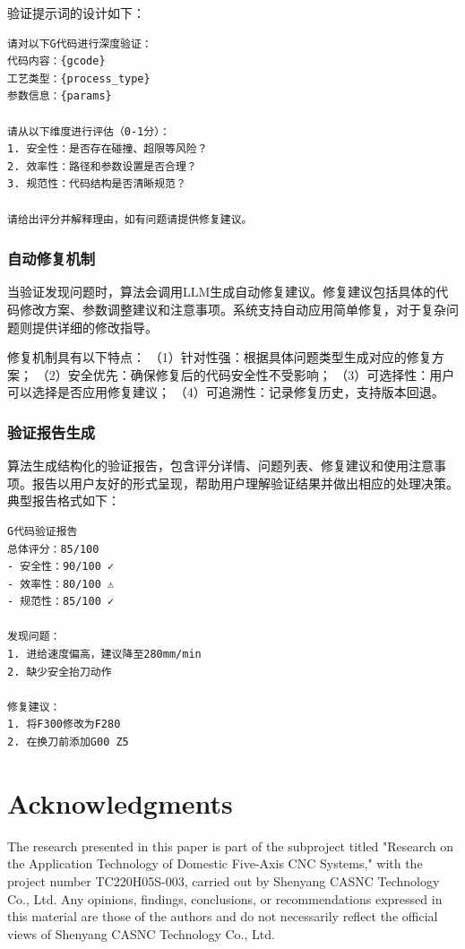 \documentclass[preprint,12pt]{elsarticle}
\begin{document}
验证提示词的设计如下：

\begin{verbatim}
请对以下G代码进行深度验证：
代码内容：{gcode}
工艺类型：{process_type}
参数信息：{params}

请从以下维度进行评估（0-1分）：
1. 安全性：是否存在碰撞、超限等风险？
2. 效率性：路径和参数设置是否合理？
3. 规范性：代码结构是否清晰规范？

请给出评分并解释理由，如有问题请提供修复建议。
\end{verbatim}

\subsubsection{自动修复机制}

当验证发现问题时，算法会调用LLM生成自动修复建议。修复建议包括具体的代码修改方案、参数调整建议和注意事项。系统支持自动应用简单修复，对于复杂问题则提供详细的修改指导。

修复机制具有以下特点：
（1）针对性强：根据具体问题类型生成对应的修复方案；
（2）安全优先：确保修复后的代码安全性不受影响；
（3）可选择性：用户可以选择是否应用修复建议；
（4）可追溯性：记录修复历史，支持版本回退。

\subsubsection{验证报告生成}

算法生成结构化的验证报告，包含评分详情、问题列表、修复建议和使用注意事项。报告以用户友好的形式呈现，帮助用户理解验证结果并做出相应的处理决策。典型报告格式如下：

\begin{verbatim}
G代码验证报告
总体评分：85/100
- 安全性：90/100 ✓
- 效率性：80/100 ⚠
- 规范性：85/100 ✓

发现问题：
1. 进给速度偏高，建议降至280mm/min
2. 缺少安全抬刀动作

修复建议：
1. 将F300修改为F280
2. 在换刀前添加G00 Z5
\end{verbatim}

\section{Acknowledgments}

The research presented in this paper is part of the subproject titled "Research on the Application Technology of Domestic Five-Axis CNC Systems," with the project number TC220H05S-003, carried out by Shenyang CASNC Technology Co., Ltd. Any opinions, findings, conclusions, or recommendations expressed in this material are those of the authors and do not necessarily reflect the official views of Shenyang CASNC Technology Co., Ltd.
\end{document}
